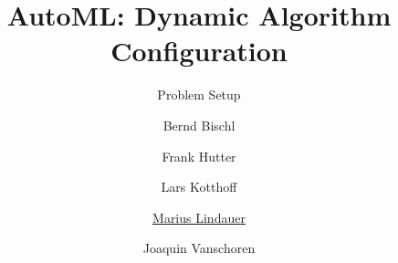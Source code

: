 




\title[AutoML: DAC]{AutoML: Dynamic Algorithm Configuration}
\subtitle{Problem Setup}
\author[Marius Lindauer]{Bernd Bischl \and Frank Hutter \and Lars Kotthoff\newline \and \underline{Marius Lindauer} \and Joaquin Vanschoren}
\institute{}
\date{}





	
	\maketitle
	

